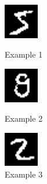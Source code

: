 \documentclass[conference]{IEEEtran}
\begin{document}


\begin{figure}[htbp]
\begin{minipage}{0.15\textwidth}
\centerline{\includegraphics[width=15mm]{./digit-images/5-0.png}}
\caption{Example 1}
\label{example1}
\end{minipage}
 \begin{minipage}{0.15\textwidth}
\centerline{\includegraphics[width=15mm]{./digit-images/9-9.png}}
\caption{Example 2}
\label{example2}
\end{minipage}
\begin{minipage}{0.15\textwidth}
 \centerline{\includegraphics[width=15mm]{./digit-images/2-4.png}}
\caption{Example 3}
\label{example3}
\end{minipage}
\end{figure}
\end{document}
